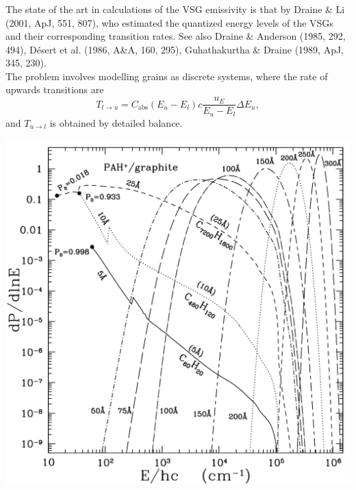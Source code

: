 \begin{frame}\frametitle{}

\begin{minipage}[t]{0.55\textwidth}
\vspace{-0.5cm}
The state of the art in calculations of the VSG emissivity is that by
Draine \& Li (2001, ApJ, 551, 807), who estimated the quantized energy
levels of the VSGs and their corresponding transition rates. See also
Draine \& Anderson (1985, 292, 494), D\'esert et al. (1986, A\&A, 160,
295), Guhathakurtha \& Draine (1989, ApJ, 345, 230).  \\

The problem involves modelling grains as discrete systems, where the
rate of upwards transitions are \[ T_{l\rightarrow u} =
C_\mathrm{abs}(E_u - E_l) c \frac{u_E}{E_u - E_l} \Delta E_u,\] and
$T_{u\rightarrow l}$ is obtained by detailed balance.

\end{minipage}
\hfill
\begin{minipage}[t]{0.4\textwidth}
\begin{center}
\vspace{0.5cm}
\includegraphics[width=\textwidth,height=!]{./D/P_E.pdf}
\end{center}
\end{minipage}


\end{frame}
